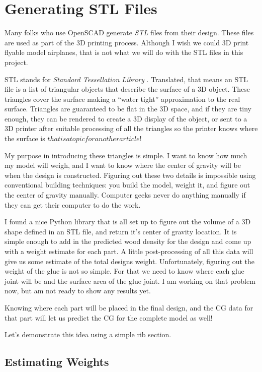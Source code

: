 \section*{Generating STL Files}

Many folks who use OpenSCAD generate {\it STL} files from their design. These
files are used as part of the 3D printing process. Although I wish we could 3D
print flyable model airplanes, that is not what we will do with the STL files
in this project.

STL stands for {\it Standard Tessellation Library} \citep{stlwiki}. Translated,
that means an STL file is a list of triangular objects that describe the
surface of a 3D object. These triangles cover the surface making a ``water
tight'' approximation to the real surface. Triangles are guaranteed to be flat
in the 3D space, and if they are tiny enough, they can be rendered to create a
3D display of the object, or sent to a 3D printer after suitable processing of all
the triangles so the printer knows where the surface is \(that is a topic for
another article!\)

My purpose in introducing these triangles is simple. I want to know how much my
model will weigh, and I want to know where the center of gravity will be when
the design is constructed. Figuring out these two details is impossible using
conventional building techniques: you build the model, weight it, and figure
out the center of gravity manually. Computer geeks never do anything manually
if they can get their computer to do the work.

I found a nice Python library that is all set up to figure out the volume of a
3D shape defined in an STL file, and return it's center of gravity location. It
is simple enough to add in the predicted wood density for the design and come
up with a weight estimate for each part. A little post-processing of all this
data will give us some estimate of the total designs weight. Unfortunately,
figuring out the weight of the glue is not so simple. For that we need to know
where each glue joint will be and the surface area of the glue joint. I am
working on that problem now, but am not ready to show any results yet.

Knowing where each part will be placed in the final design, and the CG data for
that part will let us predict the CG for the complete model as well!

Let's demonstrate this idea using a simple rib section.

\subsection{Estimating Weights}

